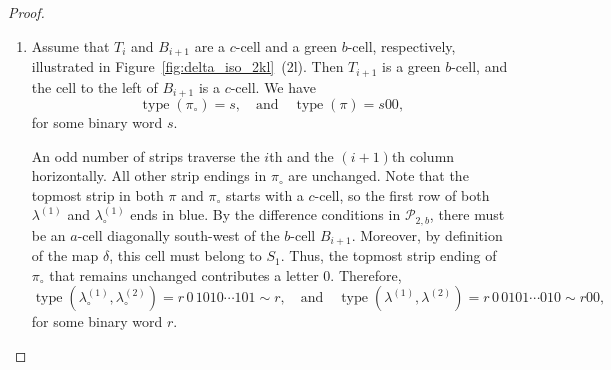 \documentclass[11pt]{article}
\theoremstyle{definition}
\theoremstyle{remark}
\theoremstyle{definition}
\numberwithin{equation}{section}
\newcommand{\type}{\operatorname{type}}
\newcommand\qand{\quad\text{and}\quad}
\begin{document}
\begin{proof}
\begin{enumerate}[label=(2\alph*)]
  An odd number of strips traverse the \(i\)th and the \((i+1)\)th
  column horizontally. All other strip endings in \(\pi_\circ\) are
  unchanged. Note that the topmost strip in both \(\pi\) and
  \(\pi_\circ\) starts with an \(a\)-cell, so the first row of both
  \(\lambda^{(1)}\) and \(\lambda_\circ^{(1)}\) ends in green. Therefore,
  \[
    \type(\lambda_\circ^{(1)},\lambda_\circ^{(2)})=r\,0101\cdots010\,0\sim r00, \qand \type(\lambda^{(1)},\lambda^{(2)})=r\,1010\cdots101\,0\sim r10,
  \]
  for some binary word \(r\).

\item Assume that \( T_i \) and \( B_{i+1} \) are a \( c \)-cell and
  a green \( b \)-cell, respectively, illustrated in
  Figure~\ref{fig:delta_iso_2kl}~(2l). Then \( T_{i+1} \) is a green
  \(b\)-cell, and the cell to the left of \( B_{i+1} \) is a
  \(c\)-cell. We have
  \[
    \type(\pi_\circ)=s, \qand \type(\pi)=s00,
  \]
  for some binary word \(s\).

  An odd number of strips traverse the \(i\)th and the \((i+1)\)th
  column horizontally. All other strip endings in \(\pi_\circ\) are
  unchanged. Note that the topmost strip in both \(\pi\) and
  \(\pi_\circ\) starts with a \(c\)-cell, so the first row of both
  \(\lambda^{(1)}\) and \(\lambda_\circ^{(1)}\) ends in blue. By the
  difference conditions in \(\mathcal{P}_{2,b}\), there must be an
  \(a\)-cell diagonally south-west of the \(b\)-cell \( B_{i+1} \).
  Moreover, by definition of the map \(\delta\), this cell must belong
  to \(S_1\). Thus, the topmost strip ending of \(\pi_\circ\) that
  remains unchanged contributes a letter \(0\). Therefore,
  \[
    \type(\lambda_\circ^{(1)},\lambda_\circ^{(2)})=r\,0\,1010\cdots101\sim
    r, \qand \type(\lambda^{(1)},\lambda^{(2)})=r\,0\,0101\cdots010\sim r00,
  \]
 for some binary word \(r\).
\begin{figure}[h]
    \centering


\end{figure}
\end{enumerate}
\end{proof}
\end{document}
